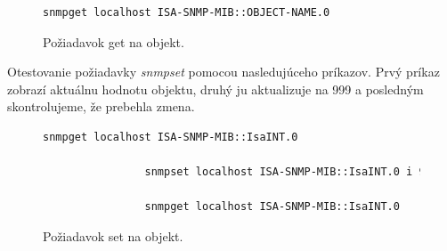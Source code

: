 \documentclass{article}
\begin{document}
	\begin{figure}[!htb]
	    \begin{lstlisting}[language=bash]
                snmpget localhost ISA-SNMP-MIB::OBJECT-NAME.0
        \end{lstlisting}
        \caption{Požiadavok get na objekt.}
    \end{figure}
    
    Otestovanie požiadavky \textit{snmpset} pomocou nasledujúceho príkazov. Prvý príkaz zobrazí aktuálnu hodnotu objektu, druhý ju aktualizuje na 999 a posledným skontrolujeme, že prebehla zmena.
	
	\begin{figure}[!htb]
	    \begin{lstlisting}[language=bash]
	        snmpget localhost ISA-SNMP-MIB::IsaINT.0
	    
                snmpset localhost ISA-SNMP-MIB::IsaINT.0 i 999
                
                snmpget localhost ISA-SNMP-MIB::IsaINT.0
        \end{lstlisting}
        \caption{Požiadavok set na objekt.}
    \end{figure}
	
\end{document}
